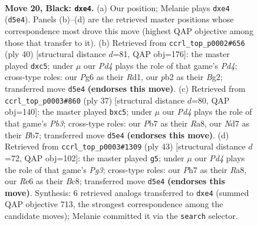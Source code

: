 \documentclass[11pt]{article}
\begin{document}
\clearpage

\begin{figure}[p]\centering
\begin{subfigure}{0.46\textwidth}\centering
\resizebox{\linewidth}{!}{%
\newchessgame
\chessboard[
  setfen={r1b3k1/pp1n3p/2pqr1p1/3p2p1/3PP3/2NB1PP1/PP3K1P/2RQR3 b - - 0 20},
  showmover=false,
  pgfstyle=straightmove, color=movearrow, markmove={d5-e4}
]}
\caption{}
\end{subfigure}\hfill
\begin{subfigure}{0.46\textwidth}\centering
\resizebox{\linewidth}{!}{%
\newchessgame
\chessboard[
  setfen={2r1qr2/p2n2pk/1pb1p2p/2p2p2/1P1PPP2/P2Q1P2/3N2BP/2RR2K1 w - - 1 21},
  showmover=false,
  pgfstyle=straightmove, color=movearrow, markmove={d4-c5}
]}
\caption{}
\end{subfigure}
\\[4pt]
\begin{subfigure}{0.46\textwidth}\centering
\resizebox{\linewidth}{!}{%
\newchessgame
\chessboard[
  setfen={r5k1/1br1qpp1/1p3n1p/p1Pp4/P7/1P1BPN1P/5PP1/2RQR1K1 b - - 0 19},
  showmover=false,
  pgfstyle=straightmove, color=movearrow, markmove={b6-c5}
]}
\caption{}
\end{subfigure}\hfill
\begin{subfigure}{0.46\textwidth}\centering
\resizebox{\linewidth}{!}{%
\newchessgame
\chessboard[
  setfen={r1bqnrk1/1p5p/p2p2p1/2pPpP2/P3P1P1/2N2R2/1P2B1QP/R5K1 b - - 5 22},
  showmover=false,
  pgfstyle=straightmove, color=movearrow, markmove={g6-g5}
]}
\caption{}
\end{subfigure}
\caption{\textbf{Move 20, Black: \texttt{dxe4}.} (a) Our position; Melanie plays \texttt{dxe4} (\texttt{d5e4}). Panels (b)--(d) are the retrieved master positions whose correspondence most drove this move (highest QAP objective among those that transfer to it). (b) Retrieved from \texttt{ccrl\_top\_p0002\#656} (ply 40) [structural distance $d$=81, QAP obj=176]: the master played \texttt{dxc5}; under $\mu$ our \emph{Pd4} plays the role of that game's \emph{Pd4}; cross-type roles: our \emph{P}g6 as their \emph{R}d1, our \emph{p}b2 as their \emph{B}g2; transferred move \texttt{d5e4} \textbf{(endorses this move)}. (c) Retrieved from \texttt{ccrl\_top\_p0003\#860} (ply 37) [structural distance $d$=80, QAP obj=140]: the master played \texttt{bxc5}; under $\mu$ our \emph{Pd4} plays the role of that game's \emph{Pb3}; cross-type roles: our \emph{P}b7 as their \emph{R}a8, our \emph{N}d7 as their \emph{B}b7; transferred move \texttt{d5e4} \textbf{(endorses this move)}. (d) Retrieved from \texttt{ccrl\_top\_p0003\#1309} (ply 43) [structural distance $d$=72, QAP obj=102]: the master played \texttt{g5}; under $\mu$ our \emph{Pd4} plays the role of that game's \emph{Pg3}; cross-type roles: our \emph{P}h7 as their \emph{R}a8, our \emph{R}e6 as their \emph{B}c8; transferred move \texttt{d5e4} \textbf{(endorses this move)}. Synthesis: 6 retrieved analogs transferred to \texttt{dxe4} (summed QAP objective 713, the strongest correspondence among the candidate moves); Melanie committed it via the \texttt{search} selector.}
\label{fig:thought-m39}
\end{figure}
\end{document}
